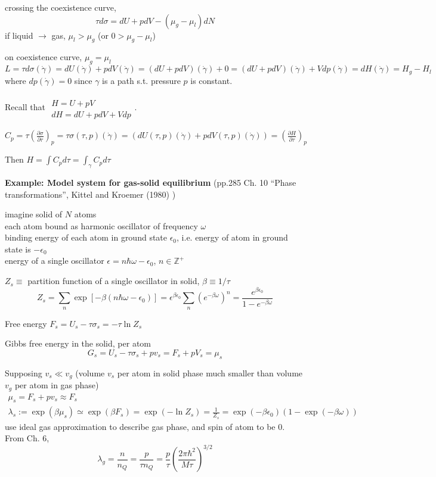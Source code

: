\documentclass[twoside]{amsart}
\theoremstyle{plain}
\theoremstyle{definition}
\begin{document}
crossing the coexistence curve,
\[
\tau d\sigma = dU + pdV - (\mu_g - \mu_l) dN
\]
if liquid $\to$ gas, $\mu_l > \mu_g$ (or $0 > \mu_g - \mu_l$)

on coexistence curve, $\mu_g = \mu_l$
\[
L = \tau d\sigma(\dot{\gamma}) = dU(\dot{\gamma}) + pdV(\dot{\gamma}) = (dU+ pdV)(\dot{\gamma}) + 0 = (dU + pdV)(\dot{\gamma}) + Vdp(\dot{\gamma}) = dH(\dot{\gamma}) = H_g -H_l
\]
where $dp(\dot{\gamma}) = 0$ since $\gamma$ is a path s.t. pressure $p$ is constant.  

Recall that $\begin{gathered} \quad \\
  H = U + pV \\
  dH = dU+ pdV + Vdp \end{gathered}$.  


$C_p = \tau \left( \frac{ \partial \sigma }{ \partial \tau} \right)_p = \tau\sigma(\tau,p)(\dot{\gamma}) = (dU(\tau,p)(\dot{\gamma}) + pdV(\tau,p)(\dot{\gamma}) ) = \left( \frac{ \partial H}{ \partial \tau} \right)_p$

Then $H = \int C_p d\tau = \int_{\gamma} C_p d\tau$

\textbf{Example: Model system for gas-solid equilibrium} (pp.285 Ch. 10 ``Phase transformations'', Kittel and Kroemer (1980) \cite{CKittelHKroemer1980})

imagine solid of $N$ atoms \\
each atom bound as harmonic oscillator of frequency $\omega$ \\
binding energy of each atom in ground state $\epsilon_0$, i.e. energy of atom in ground state is $-\epsilon_0$ \\
energy of a single oscillator $\epsilon = n\hbar \omega - \epsilon_0$, $n\in \mathbb{Z}^+$ 

$Z_s \equiv $ partition function of a single oscillator in solid, $\beta \equiv 1/\tau$
\[
Z_s = \sum_n \exp{ [ -\beta (n\hbar \omega - \epsilon_0) ]} = \epsilon^{\beta \epsilon_0} \sum_n (e^{-\beta \omega} )^n = \frac{ e^{\beta \epsilon_0}}{ 1 - e^{-\beta \omega }}
\]

Free energy $F_s = U_s - \tau \sigma_s = -\tau \ln{Z_s}$

Gibbs free energy in the solid, per atom 
\[
G_s = U_s - \tau \sigma_s + pv_s = F_s + pV_s = \mu_s
\]


Supposing $v_s \ll v_g$ (volume $v_s$ per atom in solid phase much smaller than volume $v_g$ per atom in gas phase)
\[
\begin{gathered}
  \mu_s = F_s + pv_s \approx F_s \\ 
  \lambda_s := \exp{ (\beta \mu_s)} \simeq \exp{ (\beta F_s)} = \exp{ (-\ln{ Z_s }) } = \frac{1}{Z_s} = \exp{ (-\beta \epsilon_0 )} (1- \exp{ (-\beta \omega )} )
\end{gathered}
\]
use ideal gas approximation to describe gas phase, and spin of atom to be $0$.  From Ch. 6,
\[
\lambda_g = \frac{n}{n_Q} = \frac{p}{\tau n_Q} = \frac{p}{\tau} \left( \frac{2\pi \hbar^2 }{ M \tau} \right)^{3/2}
\]
\end{document}
